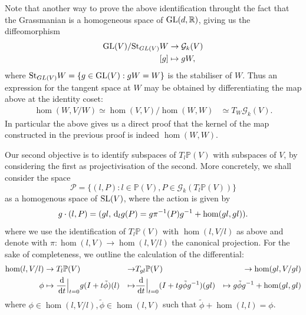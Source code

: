 \documentclass{report}
\begin{document}
Note that another way to prove the above identification throught the fact that the Grassmanian is a homogeneous space of $\operatorname{{\mathrm{GL}}}(d, \mathbb R)$, giving us the diffeomorphism
\begin{align*}
    \operatorname{{\mathrm{GL}}}(V) / \mathrm{St}_{GL(V)} W &\to \mathcal G_k(V)\\
    [g] &\mapsto gW,
\end{align*}
where $\mathrm{St}_{GL(V)} W = \{ g \in \operatorname{{\mathrm{GL}}}(V) : gW = W \}$ is the stabiliser of $W$.
Thus an expression for the tangent space at $W$ may be obtained by differentiating the map above at the identity coset:
\begin{align*}
    \hom(W, V/W) \simeq \hom(V, V) / \hom(W, W) &\simeq T_W \mathcal G_k(V).
\end{align*}
In particular the above gives us a direct proof that the kernel of the map constructed in the previous proof is indeed $\hom(W, W)$.

Our second objective is to identify subspaces of $T_l \mathbb P(V)$ with subspaces of $V$, by considering the first as projectivisation of the second.
More concretely, we shall consider the space
\[
    \mathcal P = \{ (l, P) : l \in \mathbb P(V), P \in \mathcal G_k( T_l \mathbb P(V) )  \}
\]
as a homogenous space of $\operatorname{{\mathrm{SL}}}(V)$, where the action is given by
\begin{align*}
g \cdot (l, P) = (g l, \,\mathrm{d}_l g (P) = g \pi^{-1}(P) g^{-1} + \hom(gl, gl)).
\end{align*}
where we use the identification of $T_l \mathbb P(V)$ with $\hom(l, V/l)$ as above and denote with $\pi : \hom(l, V) \to \hom(l, V/l)$ the canonical projection.
For the sake of completeness, we outline the calculation of the differential:
\begin{align*}
    \hom(l, V/l) &\to T_l \mathbb P(V) &\to &T_{gl} \mathbb P(V) &\to \hom(gl, V/gl)\\
    \phi &\mapsto \frac{\,\mathrm{d}}{\,\mathrm{d} t} \Big|_{t=0} g(I + t \tilde \phi)(l) &\mapsto &\frac{\,\mathrm{d}}{\,\mathrm{d} t} \Big|_{t=0} (I + t g\tilde \phi g^{-1})(g l) &\mapsto g \tilde \phi g^{-1} + \hom(gl, gl)
\end{align*}
where $\phi \in \hom(l, V/l), \tilde \phi \in \hom(l, V)$ such that $\tilde \phi + \hom(l, l) = \phi$.
\end{document}
